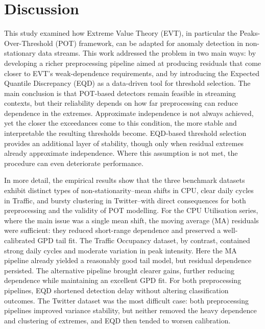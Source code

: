 \documentclass{statsmsc}
\begin{document}
\section{Discussion}\label{sec:discussion}

This study examined how Extreme Value Theory (EVT), in particular the Peaks-Over-Threshold (POT) framework, can be adapted 
for anomaly detection in non-stationary data streams. This work addressed the problem in two main ways: by developing a 
richer preprocessing pipeline aimed at producing residuals that come closer to EVT’s weak-dependence requirements, and by
introducing the Expected Quantile Discrepancy (EQD) as a data-driven tool for threshold selection. The main conclusion is
that POT-based detectors remain feasible in streaming contexts, but their reliability depends on how far preprocessing can
reduce dependence in the extremes. Approximate independence is not always achieved, yet the closer the exceedances come to
this condition, the more stable and interpretable the resulting thresholds become. EQD-based threshold selection provides 
an additional layer of stability, though only when residual extremes already approximate independence. Where this assumption
is not met, the procedure can even deteriorate performance. 

In more detail, the empirical results show that the three benchmark datasets exhibit distinct types of non-stationarity--mean shifts in CPU,
clear daily cycles in Traffic, and bursty clustering in Twitter--with direct consequences for both preprocessing and the 
validity of POT modelling. For the CPU Utilisation series, where the main issue was a single mean shift, the moving average 
(MA) residuals were sufficient: they reduced short-range dependence and preserved a well-calibrated GPD tail fit. 
The Traffic Occupancy dataset, by contrast, contained strong daily cycles and moderate variation in peak intensity. Here the 
MA pipeline already yielded a reasonably good tail model, but residual dependence persisted. The alternative pipeline brought
clearer gains, further reducing dependence while maintaining an excellent GPD fit. For both preprocessing pipelines, EQD
shortened detection delay without altering classification outcomes. The Twitter dataset was the most difficult case: both 
preprocessing pipelines improved variance stability, but neither removed the heavy dependence and clustering of extremes, 
and EQD then tended to worsen calibration.
\end{document}
